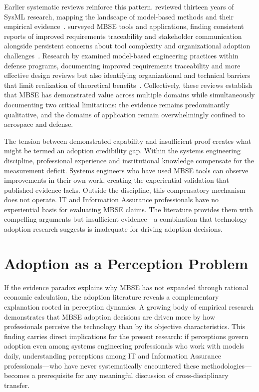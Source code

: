 Earlier systematic reviews reinforce this pattern. \citeauthor{Wolny_2020} reviewed thirteen years of SysML research, mapping the landscape of model-based methods and their empirical evidence~\parencite{Wolny_2020}. \citeauthor{Chami_Bruel_2018} surveyed MBSE tools and applications, finding consistent reports of improved requirements traceability and stakeholder communication alongside persistent concerns about tool complexity and organizational adoption challenges~\parencite{Chami_Bruel_2018}. Research by \citeauthor{gregory2019model} examined model-based engineering practices within defense programs, documenting improved requirements traceability and more effective design reviews but also identifying organizational and technical barriers that limit realization of theoretical benefits~\parencite{gregory2019model}. Collectively, these reviews establish that MBSE has demonstrated value across multiple domains while simultaneously documenting two critical limitations: the evidence remains predominantly qualitative, and the domains of application remain overwhelmingly confined to aerospace and defense.

The tension between demonstrated capability and insufficient proof creates what might be termed an adoption credibility gap. Within the systems engineering discipline, professional experience and institutional knowledge compensate for the measurement deficit. Systems engineers who have used MBSE tools can observe improvements in their own work, creating the experiential validation that published evidence lacks. Outside the discipline, this compensatory mechanism does not operate. IT and Information Assurance professionals have no experiential basis for evaluating MBSE claims. The literature provides them with compelling arguments but insufficient evidence---a combination that technology adoption research suggests is inadequate for driving adoption decisions.

\section{Adoption as a Perception Problem}

If the evidence paradox explains why MBSE has not expanded through rational economic calculation, the adoption literature reveals a complementary explanation rooted in perception dynamics. A growing body of empirical research demonstrates that MBSE adoption decisions are driven more by how professionals perceive the technology than by its objective characteristics. This finding carries direct implications for the present research: if perceptions govern adoption even among systems engineering professionals who work with models daily, understanding perceptions among IT and Information Assurance professionals---who have never systematically encountered these methodologies---becomes a prerequisite for any meaningful discussion of cross-disciplinary transfer.

